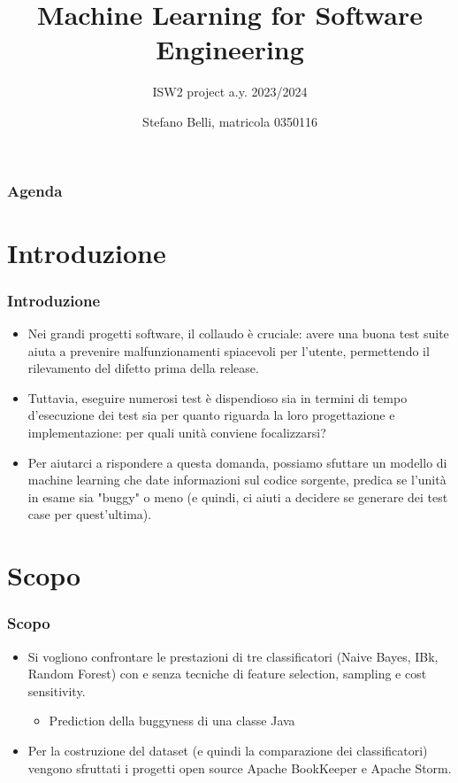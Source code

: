 \documentclass{beamer}
\title[ML for SE]{Machine Learning for Software Engineering}
\subtitle{ISW2 project a.y. 2023/2024}
\author[Stefano Belli, 0350116]{Stefano Belli, matricola 0350116}
\institute[uniroma2]{Università degli Studi di Roma "Tor Vergata"}
\date{}
\begin{document}
\begin{frame}[plain]
    \titlepage
\end{frame}

\begin{frame}
    \frametitle{Agenda}
    \fontsize{8pt}{10pt}\selectfont
    \tableofcontents
\end{frame}

\section{Introduzione}
\begin{frame}
	\frametitle{Introduzione}
	
	\begin{itemize}
		\setlength\itemsep{10pt}
	
		\item Nei grandi progetti software, il collaudo è cruciale: avere una buona test suite aiuta a prevenire
		malfunzionamenti spiacevoli per l'utente, permettendo il rilevamento del difetto prima della release.
	
		\item Tuttavia, eseguire numerosi test è dispendioso sia in termini di tempo d'esecuzione dei test sia per
		quanto riguarda la loro progettazione e implementazione: per quali unità conviene focalizzarsi?
		
		\item Per aiutarci a rispondere a questa domanda, possiamo sfuttare un modello di machine learning che 
		date informazioni sul codice sorgente, predica se l'unità in esame sia "buggy" o meno
		(e quindi, ci aiuti a decidere se generare dei test case per quest'ultima).
	\end{itemize}
\end{frame}

\section{Scopo}
\begin{frame}
	\frametitle{Scopo}
	
	\begin{itemize}
		\setlength\itemsep{10pt}
		
		\item Si vogliono confrontare le prestazioni di tre classificatori (Naive Bayes, IBk, Random Forest) con e
		senza tecniche di feature selection, sampling e cost sensitivity.
		\begin{itemize}
			\item Prediction della buggyness di una classe Java
		\end{itemize}
	
		\item Per la costruzione del dataset (e quindi la comparazione dei classificatori)
		vengono sfruttati i progetti open source Apache BookKeeper e Apache Storm.
	\end{itemize}
\end{frame}
\end{document}
